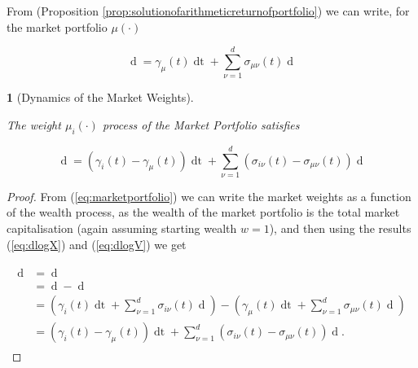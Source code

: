 \documentclass[british]{amsart} \usepackage{lmodern}
\numberwithin{equation}{section} \numberwithin{figure}{section}
\theoremstyle{plain} \newtheorem{thm}{\protect\theoremname}[section]
\theoremstyle{definition} \newtheorem{defn}[thm]{\protect\definitionname}
\theoremstyle{plain} \newtheorem{assumption}[thm]{\protect\assumptionname}
\theoremstyle{plain} \newtheorem{lem}[thm]{\protect\lemmaname}
\theoremstyle{plain} \newtheorem{prop}[thm]{\protect\propositionname}
\theoremstyle{remark} \newtheorem{rem}[thm]{\protect\remarkname}
\theoremstyle{plain} \newtheorem{cor}[thm]{\protect\corollaryname}
\renewcommand{\d}[1]{\mathop{\mathrm{d}{#1}}}
\newcommand{\Vmu}{V^{\mu}}
\begin{document}
From (Proposition \ref{prop:solutionofarithmeticreturnofportfolio}) we can
write, for the market portfolio $\mu(\cdot)$

\begin{equation} 
  \label{eq:dlogV}
  \d{\log{\Vmu}(t)} =  \gamma_{\mu}(t)\d{t} + 
        \sum_{\nu=1}^{d} \sigma_{\mu\nu}(t) \d{W_{\nu}(t)} 
\end{equation}

\begin{prop} [Dynamics of the Market Weights]
  \label{prop:dynamicsofmarketweights}

  The weight $\mu_{i}(\cdot)$ process of the Market Portfolio satisfies 

  \begin{equation} 
    \d{\log{\mu_{i}(t)}} = (\gamma_{i}(t) - \gamma_{\mu}(t))\d{t} +
        \sum_{\nu=1}^{d} \left( \sigma_{i\nu}(t) - \sigma_{\mu\nu}(t) \right) \d{W_{\nu}(t)} 
  \end{equation}

\end{prop}

\begin{proof}
  
  From (\ref{eq:marketportfolio}) we can write the market weights as a function
  of the wealth process, as the wealth of the market portfolio is the total market
  capitalisation (again assuming starting wealth $w=1$), and then using the results 
  (\ref{eq:dlogX}) and (\ref{eq:dlogV}) we get

  \begin{gather} 
    \begin{split} 
      \d{\log{\mu_{i}(t)}} 
        &= \d{\log{ \left( \frac{ X_{i}(t) }{ \Vmu(t) } \right)}}  \\
        &= \d{ \log{X_{i}(t)} } - \d{ \log{\Vmu(t)} } \\ 
        &= 
            \left(
              \gamma_{i}(t) \d{t} + \sum_{\nu=1}^{d} \sigma_{i\nu}(t) \d{W_{\nu}(t)}
            \right) -
            \left(
              \gamma_{\mu}(t)\d{t} + \sum_{\nu=1}^{d} \sigma_{\mu\nu}(t) \d{W_{\nu}(t)} 
            \right) \\
        &=
            (\gamma_{i}(t) - \gamma_{\mu}(t))\d{t} +
              \sum_{\nu=1}^{d} 
              \left( 
                \sigma_{i\nu}(t) - \sigma_{\mu\nu}(t) 
              \right) \d{W_{\nu}(t)}. 
    \end{split} 
  \end{gather}

\end{proof}
\end{document}
